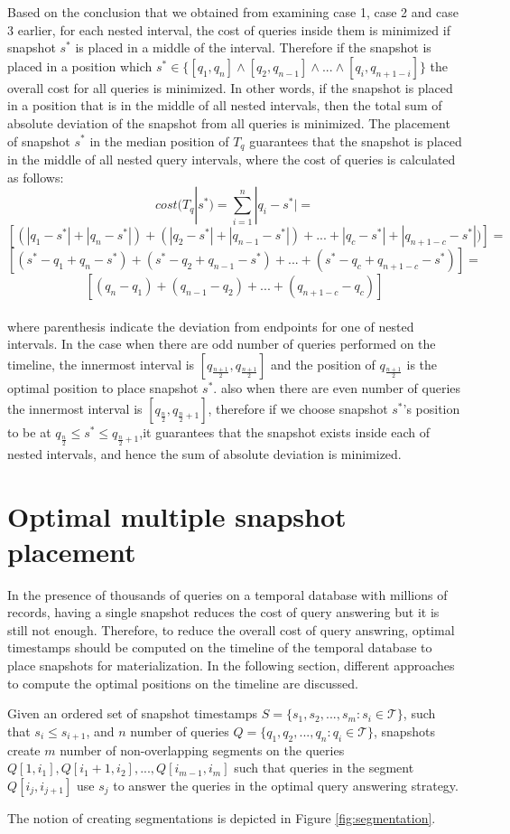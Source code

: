 	Based on the conclusion that we obtained from examining case 1, case 2 and case 3 earlier, for each nested interval, the cost of queries inside them is minimized if snapshot $s^*$ is placed in a middle of the interval. Therefore if the snapshot is placed in a position which $s^*\in \{ [q_1,q_n] \wedge [q_2,q_{n-1}] \wedge ... \wedge [q_i,q_{n+1-i}] \}$ the overall cost for all queries is minimized. In other words, if the snapshot is placed in a position that is in the middle of all nested intervals, then the total sum of absolute deviation of the snapshot from all queries is minimized. The placement of snapshot $s^*$ in the median position of $T_q$ guarantees that the snapshot is placed in the middle of all nested query intervals, where the cost of queries is calculated as follows:
	$$cost(T_q|s^*)=\sum_{i=1}^n |q_i-s^*| = $$
	$$[(|q_1-s^*|+|q_n-s^*|)+(|q_2-s^*|+|q_{n-1}-s^*|)+...+|q_c-s^*|+|q_{n+1-c}-s^*|)]=$$
	$$[(s^*-q_1+q_n-s^*)+(s^*-q_2+q_{n-1}-s^*)+...+(s^*-q_c+q_{n+1-c}-s^*)]=$$
	$$[(q_n-q_1)+(q_{n-1}-q_2)+...+(q_{n+1-c}-q_c)]$$\\
	where parenthesis indicate the deviation from endpoints for one of nested intervals. In the case when there are odd number of queries performed on the timeline, the innermost interval is $[q_{\frac{n+1}{2}},q_{\frac{n+1}{2}}]$ and the position of $q_{\frac{n+1}{2}}$ is the optimal position to place snapshot $s^*$. also when there are even number of queries the innermost interval is $[q_{\frac{n}{2}},q_{\frac{n}{2}+1}]$, therefore if we choose snapshot $s^*$'s position to be at $q_{\frac{n}{2}}\leq s^*\leq q_{\frac{n}{2}+1}$,it guarantees that the snapshot exists inside each of nested intervals, and hence the sum of absolute deviation is minimized. 


\section{Optimal multiple snapshot placement}
In the presence of thousands of queries on a temporal database with millions of records, having a single snapshot reduces the cost of query answering but it is still not enough. Therefore, to reduce the overall cost of query answring, optimal timestamps should be computed on the timeline of the temporal database to place snapshots for materialization. In the following section, different approaches to compute the optimal positions on the timeline are discussed.

\begin{prop} 
	Given an ordered set of snapshot timestamps $S=\{s_1,s_2,...,s_m:s_i \in \mathcal{T}\}$, such that $s_i \leq s_{i+1}$, and $n$ number of queries $Q = \{q_1,q_2,...,q_n: q_i \in \mathcal{T}\}$, snapshots create $m$ number of non-overlapping segments on the queries $Q[1,i_1],Q[i_1+1,i_2],...,Q[i_{m-1},i_m]$ such that queries in the segment $Q[i_j,i_{j+1}]$ use $s_j$ to answer the queries in the optimal query answering strategy.
\label{prop:segmentation_of_queries}
\end{prop}
The notion of creating segmentations is depicted in Figure \ref{fig:segmentation}.

